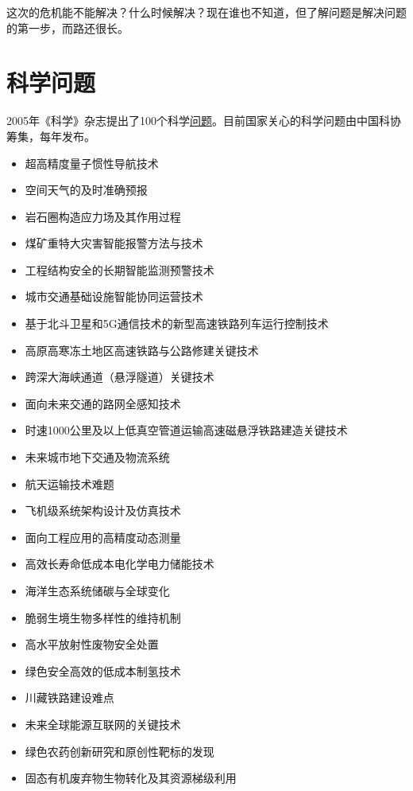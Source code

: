 \documentclass[]{tufte-book}
\providecommand{\tightlist}{%
  \setlength{\itemsep}{0pt}\setlength{\parskip}{0pt}}
\begin{document}
这次的危机能不能解决？什么时候解决？现在谁也不知道，但了解问题是解决问题的第一步，而路还很长。

\hypertarget{ux79d1ux5b66ux95eeux9898}{%
\section{科学问题}\label{ux79d1ux5b66ux95eeux9898}}

2005年《科学》杂志提出了100个科学\href{https://science.sciencemag.org/content/309/5731/78.2}{问题}。目前国家关心的科学问题由中国科协筹集，每年发布。

\begin{itemize}
\tightlist
\item
  超高精度量子惯性导航技术
\item
  空间天气的及时准确预报
\item
  岩石圈构造应力场及其作用过程
\item
  煤矿重特大灾害智能报警方法与技术
\item
  工程结构安全的长期智能监测预警技术
\item
  城市交通基础设施智能协同运营技术
\item
  基于北斗卫星和5G通信技术的新型高速铁路列车运行控制技术
\item
  高原高寒冻土地区高速铁路与公路修建关键技术
\item
  跨深大海峡通道（悬浮隧道）关键技术
\item
  面向未来交通的路网全感知技术
\item
  时速1000公里及以上低真空管道运输高速磁悬浮铁路建造关键技术
\item
  未来城市地下交通及物流系统
\item
  航天运输技术难题
\item
  飞机级系统架构设计及仿真技术
\item
  面向工程应用的高精度动态测量
\item
  高效长寿命低成本电化学电力储能技术
\item
  海洋生态系统储碳与全球变化
\item
  脆弱生境生物多样性的维持机制
\item
  高水平放射性废物安全处置
\item
  绿色安全高效的低成本制氢技术
\item
  川藏铁路建设难点
\item
  未来全球能源互联网的关键技术
\item
  绿色农药创新研究和原创性靶标的发现
\item
  固态有机废弃物生物转化及其资源梯级利用

\end{itemize}
\end{document}

